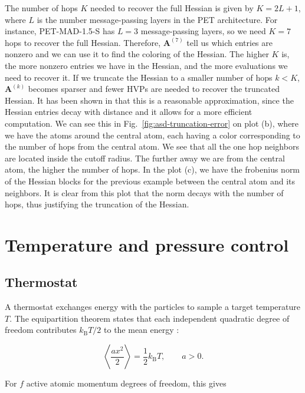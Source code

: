 \documentclass[12pt,a4paper]{article}
\numberwithin{equation}{section}
\begin{document}
The number of hops $K$ needed to recover the full Hessian is given by $K=2L+1$,
where $L$ is the number message-passing layers in the PET architecture.
For instance, PET-MAD-1.5-S has $L=3$ message-passing layers, so we need $K=7$ hops to recover the full Hessian.
Therefore, $\bm A^{(7)}$ tell us which entries are nonzero and we can use it to find the coloring of the Hessian.
The higher $K$ is, the more nonzero entries we have in the Hessian, and the more evaluations we need to recover it.
If we truncate the Hessian to a smaller number of hops $k<K$,
$\bm A^{(k)}$ becomes sparser and fewer HVPs are needed to recover the truncated Hessian.
It has been shown in \cite{sadmof} that this is a reasonable approximation, since the Hessian entries decay with distance
and it allows for a more efficient computation.
We can see this in Fig.~\ref{fig:asd-truncation-error} on plot (b), where we have the atoms around the central atom,
each having a color corresponding to the number of hops from the central atom.
We see that all the one hop neighbors are located inside the cutoff radius. The further away we are from the central atom,
the higher the number of hops.
In the plot (c), we have the frobenius norm of the Hessian blocks for the previous example between the central atom and its neighbors.
It is clear from this plot that the norm decays with the number of hops, thus justifying the truncation of the Hessian.

\section{Temperature and pressure control}
\label{sec:thermostat-barostat}

\subsection{Thermostat}

A thermostat exchanges energy with the particles to sample a target
temperature $T$. The equipartition theorem states that each independent
quadratic degree of freedom contributes $k_{\mathrm B}T/2$ to the mean
energy \cite{tuckerman2023}:

\begin{equation}
  \left\langle\frac{a x^2}{2}\right\rangle=\frac12 k_{\mathrm B}T,
  \qquad a>0.
  \label{eq:equipartition-derivation}
\end{equation}

For $f$ active atomic momentum degrees of freedom, this gives
\end{document}
